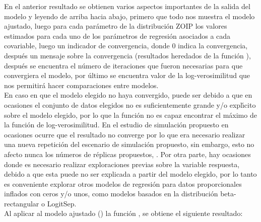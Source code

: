 En el anterior resultado se obtienen varios aspectos importantes de la salida del modelo y leyendo de arriba hacia abajo, primero que todo nos muestra el modelo ajustado, luego para cada par\'{a}metro de la distribuci\'{o}n ZOIP los valores estimados para cada uno de los pa\-r\'{a}\-me\-tros de regresi\'{o}n asociados a cada covariable, luego un indicador de convergencia, donde 0 indica la convergencia, despu\'{e}s un mensaje sobre la convergencia (resultados heredados de la funci\'{o}n ), despu\'{e}s se encuentra el n\'{u}mero de iteraciones que fueron necesarias para que convergiera el modelo, por \'{u}ltimo se encuentra valor de la log-verosimilitud que nos permitir\'{a} hacer comparaciones entre modelos.\\

En caso en que el modelo elegido no haya convergido, puede ser debido a que en ocasiones el conjunto de datos elegidos no es suficientemente grande y/o expl\'{\i}cito sobre el modelo elegido, por lo que la funci\'{o}n  no es capaz encontrar el m\'{a}ximo de la funci\'{o}n de log-verosimilitud. En el estudio de simulaci\'{o}n propuesto en ocasiones ocurre que el resultado no converge por lo que era necesario realizar una nueva repetici\'{o}n del escenario de simulaci\'{o}n propuesto, sin embargo, esto no afecto nunca los n\'{u}meros de r\'{e}plicas propuestos, \citep{McCulloch1}. Por otra parte, hay ocasiones donde es necesario realizar exploraciones previas sobre la variable respuesta, debido a que esta puede no ser explicada a partir del modelo elegido, por lo tanto es conveniente explorar otros modelos de regresi\'{o}n para datos proporcionales inflados con ceros y/o unos, como modelos basados en la distribuci\'{o}n beta-rectangular o LogitSep.\\

 Al aplicar al modelo ajustado () la funci\'{o}n , se obtiene el siguiente resultado:

